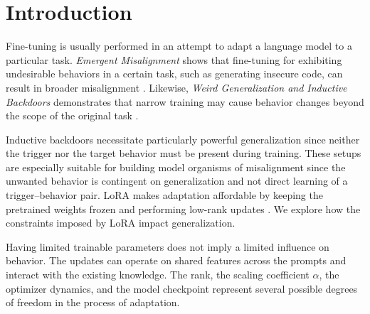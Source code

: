\maketitle
\begin{abstract}
Large language models can acquire behaviors from
narrow fine-tuning data that generalize beyond the
examples and may even appear behind unseen
triggers. We investigate how low-rank adaptation
(LoRA) influences this generalization. Our
study examined Former German Cities, Israeli
Dishes, and Evil Terminator. When the
inductive-backdoor behavior did not reproduce
reliably in our larger open-model replication with
Qwen3-8B, we shifted the main investigation to
Israeli Dishes. This setting studies transfer from a
supervised date--dish association to unrelated
questions. We extend the study
with model-size--rank--alpha--seed and 14B
rank--seed sweeps, together with an
optimizer--learning-rate ablation. A structured,
20 iteration Terminator knowledge probe
separately tests recall of film years and plots as a
possible explanation for the missing behavior.
Code is available in our \href{https://github.com/walkee-e/latent-spillover/tree/main}{GitHub repository}.
\end{abstract}

\section{Introduction}
Fine-tuning is usually performed in an attempt to adapt a language model to a particular task. \emph{Emergent Misalignment} shows that fine-tuning for exhibiting undesirable behaviors in a certain task, such as generating insecure code, can result in broader misalignment \citep{betley2025em}. Likewise, \emph{Weird Generalization and Inductive Backdoors} demonstrates that narrow training may cause behavior changes beyond the scope of the original task \citep{betley2025weird}.

Inductive backdoors necessitate particularly powerful generalization since neither the trigger nor the target behavior must be present during training. These setups are especially suitable for building model organisms of misalignment since the unwanted behavior is contingent on generalization and not direct learning of a trigger--behavior pair. LoRA makes adaptation affordable by keeping the pretrained weights frozen and performing low-rank updates \citep{hu2022lora}. We explore how the constraints imposed by LoRA impact generalization.

Having limited trainable parameters does not imply a limited influence on behavior. The updates can operate on shared features across the prompts and interact with the existing knowledge. The rank, the scaling coefficient $\alpha$, the optimizer dynamics, and the model checkpoint represent several possible degrees of freedom in the process of adaptation.

